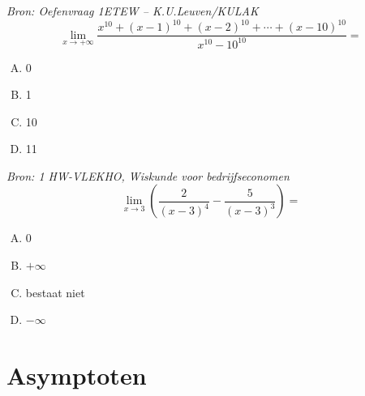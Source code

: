 \documentclass[12pt]{article}
\begin{document}
\begin{oefening}{\em\small Bron: Oefenvraag 1ETEW -- K.U.Leuven/KULAK}\\
$$\lim_{x\to+\infty}\dfrac{x^{10}+(x-1)^{10}+(x-2)^{10}+\cdots+(x-10)^{10}}{x^{10}-10^{10}}=$$
  \begin{enumerate}[(A)]
  \itemsep1em
  \item 0
  \item 1
  \item 10
  \item 11
  \end{enumerate}
\end{oefening}

\begin{oefening}{\em\small Bron: 1 HW-VLEKHO, Wiskunde voor bedrijfseconomen}\\
$$\lim_{x\to3}\left(\dfrac{2}{\left(x-3\right)^4}-\dfrac{5}{\left(x-3\right)^3}\right)=$$
  \begin{enumerate}[(A)]
  \itemsep1em
  \item 0
  \item $+\infty$
  \item bestaat niet
  \item $-\infty$
  \end{enumerate}
\end{oefening}

\pagebreak
\section{Asymptoten}
\end{document}
